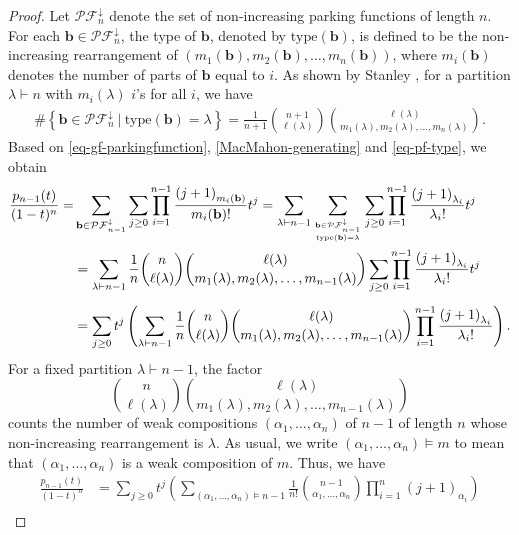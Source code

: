 \documentclass[12pt]{article}
\newcommand{\PF}{\mathcal{PF}}
\newcommand{\type}{\mathrm{type}}
\newcommand{\PP}{p}
\numberwithin{equation}{section}
\begin{document}
\begin{proof}
Let $\PF_n^\downarrow$ denote the set of non-increasing parking functions of length $n$. For each $\mathbf{b}\in \PF_n^\downarrow$, the type of $\mathbf{b}$, denoted by $\mathrm{type}(\mathbf{b})$, is defined to be the non-increasing rearrangement of  $(m_1(\mathbf{b}),m_2(\mathbf{b}),\ldots,m_n(\mathbf{b}))$, where $m_i(\mathbf{b})$ denotes the number of parts of $\mathbf{b}$ equal to $i$.  
As shown by Stanley \cite{Stanley-1997}, for a partition $\lambda\vdash n$ with $m_i(\lambda)$ $i$'s for all $i$, we have 
\begin{align}\label{eq-pf-type}
\#\left \{ \mathbf{b} \in \PF_n^{\downarrow} ~\big|~\type(\mathbf{b})=\lambda \right \}
=
\frac{1}{n+1}\binom{n+1}{\ell(\lambda)}\binom{\ell(\lambda)}{m_1(\lambda),m_2(\lambda),\ldots,m_n(\lambda)}.
\end{align}
Based on \eqref{eq-gf-parkingfunction}, \eqref{MacMahon-generating} and 
\eqref{eq-pf-type}, 
we obtain 
\begin{align*}
\frac{\PP_{n-1}(t)}{{(1-t)^{n}}}
=&\sum_{\mathbf{b}\in \PF_{n-1}^\downarrow}\sum_{j\geq 0}\prod_{i=1}^{n-1}\frac{\left(j+1\right)_{m_i(\mathbf{b})}}{m_i(\mathbf{b})!}t^{j}
=\sum_{\lambda\vdash n-1}\sum_{\genfrac{}{}{0pt}{2}{\mathbf{b}\in \PF_{n-1}^\downarrow}{\mathrm{type}(\mathbf{b})=\lambda}}\sum_{j\geq 0} \prod_{i=1}^{n-1} \frac{\left(j+1\right)_{\lambda_i}}{\lambda_i!}t^{j}\\%
&=\sum_{\lambda\vdash n-1}
\frac{1}{n}\binom{n}{\ell(\lambda)}\binom{\ell(\lambda)}{m_1(\lambda),m_2(\lambda),\ldots,m_{n-1}(\lambda)}
\sum_{j \geq 0}\prod_{i=1}^{n-1} \frac{\left(j+1\right)_{\lambda_i}}{\lambda_i!}t^{j}\\[5pt]
&=\sum_{j \geq 0}t^{j}\left(\sum_{\lambda\vdash n-1}
\frac{1}{n}\binom{n}{\ell(\lambda)}\binom{\ell(\lambda)}{m_1(\lambda),m_2(\lambda),\ldots,m_{n-1}(\lambda)}
\prod_{i=1}^{n-1} \frac{\left(j+1\right)_{\lambda_i}}{\lambda_i!}\right).
\end{align*}
For a fixed partition $\lambda\vdash n-1$, the factor
$$\binom{n}{\ell(\lambda)}\binom{\ell(\lambda)}{m_1(\lambda),m_2(\lambda),\ldots,m_{n-1}(\lambda)}$$
counts the number of weak compositions $(\alpha_1,\ldots,\alpha_n)$ of $n-1$ of length $n$ whose non-increasing rearrangement is $\lambda$. As usual, we write $(\alpha_1,\ldots,\alpha_n)\vDash m$ to mean that $(\alpha_1,\ldots,\alpha_n)$ is a weak composition of $m$. Thus, we have 
\begin{align*}
\frac{\PP_{n-1}(t)}{{(1-t)^{n}}}
&=\sum_{j \geq 0}t^{j}\left(\sum_{(\alpha_1,\ldots,\alpha_n)\vDash n-1}
\frac{1}{n!}\binom{n-1}{\alpha_1,\ldots,\alpha_n}\prod_{i=1}^{n}{\left(j+1\right)_{\alpha_i}}\right)\\[5pt]

\end{align*}
\end{proof}
\end{document}
